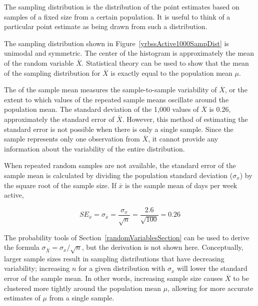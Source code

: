 \begin{spacing}{1.5}
\begin{termBox}{
The sampling distribution is the distribution of the point estimates based on samples of a fixed size from a certain population. It is useful to think of a particular point estimate as being drawn from such a distribution.}
\end{termBox}

The sampling distribution shown in Figure~\ref{yrbssActive1000SampDist} is unimodal and symmetric. The center of the histogram is approximately the mean of the random variable $\overline{X}$. Statistical theory can be used to show that the mean of the sampling distribution for $\overline{X}$ is exactly equal to the population mean $\mu$. 

The  of the sample mean measures the sample-to-sample variability of $\overline{X}$, or the extent to which values of the repeated sample means oscillate around the population mean. The standard deviation of the 1,000 values of $\overline{X}$ is 0.26, approximately the standard error of $\overline{X}$. However, this method of estimating the standard error is not possible when there is only a single sample. Since the sample represents only one observation from $\overline{X}$, it cannot provide any information about the variability of the entire distribution.

When repeated random samples are not available, the standard error of the sample mean is calculated by dividing the population standard deviation ($\sigma_{x}$) by the square root of the sample size. If $\overline{x}$ is the sample mean of days per week active,

\[SE_{\overline{x}} = \sigma_{\overline{x}} = \dfrac{\sigma_{x}}{\sqrt{n}} = \dfrac{2.6}{\sqrt{100}} = 0.26\]

The probability tools of Section~\ref{randomVariablesSection} can be used to derive the formula $\sigma_{\overline{X}} = \sigma_x/\sqrt{n}$, but the derivation is not shown here. Conceptually, larger sample sizes result in sampling distributions that have decreasing variability; increasing $n$ for a given distribution with $\sigma_{x}$ will lower the standard error of the sample mean. In other words, increasing sample size causes $\overline{X}$ to be clustered more tightly around the population mean $\mu$, allowing for more accurate estimates of $\mu$ from a single sample.



\end{spacing}
